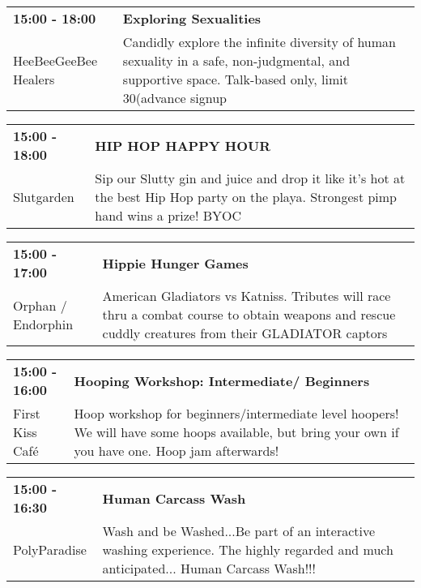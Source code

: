 \begin{tabular}{ p{1in} p{2.2in} }
    \textbf{15:00 - 18:00} & \textbf{Exploring Sexualities } \\
    HeeBeeGeeBee Healers \newline  & Candidly explore the infinite diversity of human sexuality in a safe, non-judgmental, and supportive space. Talk-based only, limit 30(advance signup \\
    \hline 
\end{tabular}
    
\begin{tabular}{ p{1in} p{2.2in} }
    \textbf{15:00 - 18:00} & \textbf{HIP HOP HAPPY HOUR} \\
    Slutgarden \newline  & Sip our Slutty gin and juice and drop it like it's hot at the best Hip Hop party on the playa. Strongest pimp hand wins a prize! BYOC \\
    \hline 
\end{tabular}
    
\begin{tabular}{ p{1in} p{2.2in} }
    \textbf{15:00 - 17:00} & \textbf{Hippie Hunger Games} \\
    Orphan / Endorphin \newline  & American Gladiators vs Katniss. Tributes will race thru a combat course to obtain weapons and rescue cuddly creatures from their GLADIATOR captors \\
    \hline 
\end{tabular}
    
\begin{tabular}{ p{1in} p{2.2in} }
    \textbf{15:00 - 16:00} & \textbf{Hooping Workshop: Intermediate/ Beginners} \\
    First Kiss Caf\'e \newline  & Hoop workshop for beginners/intermediate level hoopers! We will have some hoops available, but bring your own if you have one.  Hoop jam afterwards! \\
    \hline 
\end{tabular}
    
\begin{tabular}{ p{1in} p{2.2in} }
    \textbf{15:00 - 16:30} & \textbf{Human Carcass Wash} \\
    PolyParadise \newline  & Wash and be Washed...Be part of an interactive washing experience.
The highly regarded and much anticipated... Human Carcass Wash!!! \\
    \hline 
\end{tabular}
    
